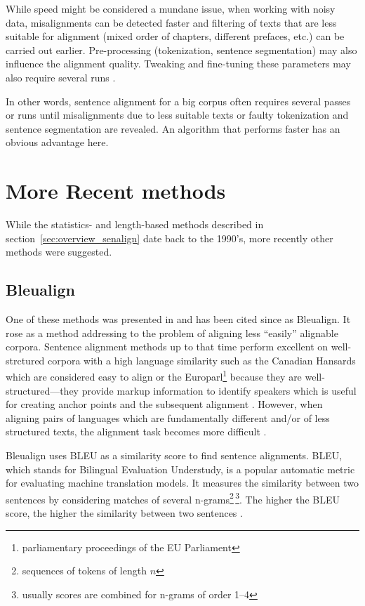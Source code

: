 While speed might be considered a mundane issue, when working with noisy data, misalignments can be detected faster and filtering of texts that are less suitable for alignment (mixed order of chapters, different prefaces, etc.) 
can be carried out earlier. 
Pre-processing (tokenization, sentence segmentation) may also influence the alignment quality. 
Tweaking and fine-tuning these parameters may also require several runs
\autocite{hunalign}. 

In other words, sentence alignment for a big corpus often requires several passes or runs until misalignments due to less suitable texts or faulty tokenization and sentence segmentation are revealed. An algorithm that performs faster has an obvious advantage here.

\section{More Recent methods}
While the statistics- and length-based  methods described in section~\ref{sec:overview_senalign} date back to the 1990's, more recently other methods were suggested.

\subsection{Bleualign}

One of these methods was presented in \cite{sennrich-volk-2010-mt} and has been cited since as Bleualign. 
It rose as a method addressing to the problem of aligning less \enquote{easily} alignable corpora. 
Sentence alignment methods up to that time perform excellent on well-strctured corpora with a high language similarity such as the Canadian Hansards  which are considered easy to align  or the Europarl\footnote{parliamentary proceedings of the EU Parliament} because they are well-structured---they provide markup information to identify speakers which is useful for creating anchor points and the subsequent alignment \autocites{simard-plamondon-1996-bilingual,sennrich-volk-2011-iterative}. 
However, when aligning pairs of languages which are fundamentally different and/or of less structured texts, the alignment task becomes more difficult \autocite{sennrich-volk-2010-mt}.

Bleualign uses BLEU as a similarity score to find sentence alignments. 
BLEU, which stands for Bilingual Evaluation Understudy, is a popular automatic metric for evaluating machine translation models. It measures the similarity between two sentences by considering matches of several n-grams\footnote{sequences of tokens of length \(n\)}\,\footnote{usually scores are combined for n-grams of order 1--4}. 
The higher the BLEU score, the higher the similarity between two sentences \autocite[226]{koehn2009}.

